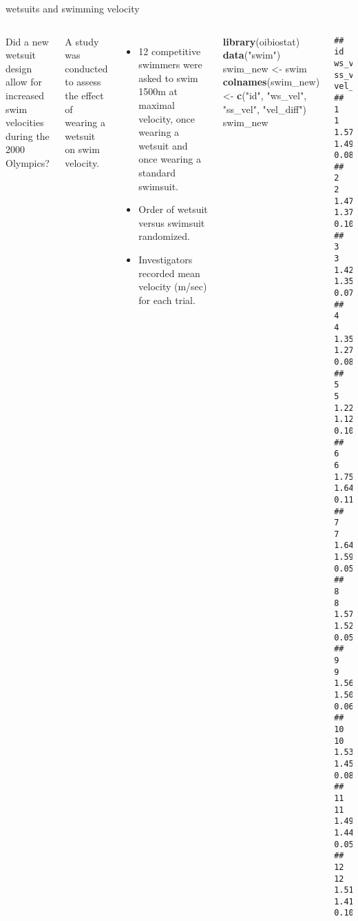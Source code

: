 \documentclass[
  ignorenonframetext,
  aspectratio=169]{beamer}
\newenvironment{Shaded}{\begin{snugshade}}{\end{snugshade}}
\newcommand{\FunctionTok}[1]{\textcolor[rgb]{0.13,0.29,0.53}{\textbf{#1}}}
\newcommand{\NormalTok}[1]{#1}
\newcommand{\OtherTok}[1]{\textcolor[rgb]{0.56,0.35,0.01}{#1}}
\newcommand{\StringTok}[1]{\textcolor[rgb]{0.31,0.60,0.02}{#1}}
\newcommand{\columnsbegin}{\begin{columns}}
\newcommand{\columnsend}{\end{columns}}
\begin{document}
\begin{frame}[fragile]{wetsuits and swimming velocity}
\protect\hypertarget{wetsuits-and-swimming-velocity}{}
\columnsbegin


\footnotesize

Did a new wetsuit design allow for increased swim velocities during the
2000 Olympics?

\vspace{0.5cm}

A study was conducted to assess the effect of wearing a wetsuit on swim
velocity.

\begin{itemize}
\item
  12 competitive swimmers were asked to swim 1500m at maximal velocity,
  once wearing a wetsuit and once wearing a standard swimsuit.
\item
  Order of wetsuit versus swimsuit randomized.
\item
  Investigators recorded mean velocity (m/sec) for each trial.
\end{itemize}


\scriptsize

\begin{Shaded}
\begin{Highlighting}[]
\FunctionTok{library}\NormalTok{(oibiostat)}
\FunctionTok{data}\NormalTok{(}\StringTok{"swim"}\NormalTok{)}
\NormalTok{swim\_new }\OtherTok{\textless{}{-}}\NormalTok{ swim}
\FunctionTok{colnames}\NormalTok{(swim\_new) }\OtherTok{\textless{}{-}} \FunctionTok{c}\NormalTok{(}\StringTok{"id"}\NormalTok{, }\StringTok{"ws\_vel"}\NormalTok{, }
                        \StringTok{"ss\_vel"}\NormalTok{, }\StringTok{"vel\_diff"}\NormalTok{)}
\NormalTok{swim\_new}
\end{Highlighting}
\end{Shaded}

\begin{verbatim}
##    id ws_vel ss_vel vel_diff
## 1   1   1.57   1.49     0.08
## 2   2   1.47   1.37     0.10
## 3   3   1.42   1.35     0.07
## 4   4   1.35   1.27     0.08
## 5   5   1.22   1.12     0.10
## 6   6   1.75   1.64     0.11
## 7   7   1.64   1.59     0.05
## 8   8   1.57   1.52     0.05
## 9   9   1.56   1.50     0.06
## 10 10   1.53   1.45     0.08
## 11 11   1.49   1.44     0.05
## 12 12   1.51   1.41     0.10
\end{verbatim}

\columnsend
\end{frame}
\end{document}
